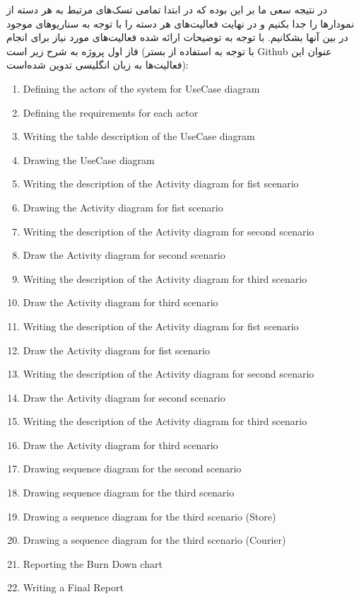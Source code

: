 \documentclass[]{article}
\begin{document}
در نتیجه سعی ما بر این بوده که در ابتدا تمامی تسک‌های مرتبط به هر دسته
از نمودارها را جدا بکنیم و در نهایت فعالیت‌های هر دسته را با توجه به
سناریوهای موجود در بین آنها بشکانیم. با توجه به توضیحات ارائه شده
فعالیت‌های مورد نیاز برای انجام فاز اول پروژه به شرح زیر است (با توجه به
استفاده از بستر Github عنوان این فعالیت‌ها به زبان انگلیسی تدوین
شده‌است):

\begin{enumerate}
\def\labelenumi{\arabic{enumi})}
\item
  Defining the actors of the system for UseCase diagram
\item
  Defining the requirements for each actor
\item
  Writing the table description of the UseCase diagram
\item
  Drawing the UseCase diagram
\item
  Writing the description of the Activity diagram for fist scenario
\item
  Drawing the Activity diagram for fist scenario
\item
  Writing the description of the Activity diagram for second scenario
\item
  Draw the Activity diagram for second scenario
\item
  Writing the description of the Activity diagram for third scenario
\item
  Draw the Activity diagram for third scenario
\item
  Writing the description of the Activity diagram for fist scenario
\item
  Draw the Activity diagram for fist scenario
\item
  Writing the description of the Activity diagram for second scenario
\item
  Draw the Activity diagram for second scenario
\item
  Writing the description of the Activity diagram for third scenario
\item
  Draw the Activity diagram for third scenario
\item
  Drawing sequence diagram for the second scenario
\item
  Drawing sequence diagram for the third scenario
\item
  Drawing a sequence diagram for the third scenario (Store)
\item
  Drawing a sequence diagram for the third scenario (Courier)
\item
  Reporting the Burn Down chart
\item
  Writing a Final Report
\end{enumerate}
\end{document}
